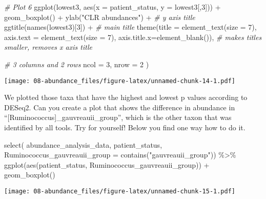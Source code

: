 \documentclass[
  oneside]{book}
\newenvironment{Shaded}{\begin{snugshade}}{\end{snugshade}}
\newcommand{\AttributeTok}[1]{\textcolor[rgb]{0.77,0.63,0.00}{#1}}
\newcommand{\CommentTok}[1]{\textcolor[rgb]{0.56,0.35,0.01}{\textit{#1}}}
\newcommand{\DecValTok}[1]{\textcolor[rgb]{0.00,0.00,0.81}{#1}}
\newcommand{\FunctionTok}[1]{\textcolor[rgb]{0.00,0.00,0.00}{#1}}
\newcommand{\NormalTok}[1]{#1}
\newcommand{\SpecialCharTok}[1]{\textcolor[rgb]{0.00,0.00,0.00}{#1}}
\newcommand{\StringTok}[1]{\textcolor[rgb]{0.31,0.60,0.02}{#1}}
\begin{document}
\begin{Shaded}
\begin{Highlighting}[]
  \CommentTok{\# Plot 6}
  \FunctionTok{ggplot}\NormalTok{(lowest3, }\FunctionTok{aes}\NormalTok{(}\AttributeTok{x =}\NormalTok{ patient\_status, }\AttributeTok{y =}\NormalTok{ lowest3[,}\DecValTok{3}\NormalTok{])) }\SpecialCharTok{+} 
    \FunctionTok{geom\_boxplot}\NormalTok{() }\SpecialCharTok{+} 
    \FunctionTok{ylab}\NormalTok{(}\StringTok{"CLR abundances"}\NormalTok{) }\SpecialCharTok{+} \CommentTok{\# y axis title}
    \FunctionTok{ggtitle}\NormalTok{(}\FunctionTok{names}\NormalTok{(lowest3)[}\DecValTok{3}\NormalTok{]) }\SpecialCharTok{+} \CommentTok{\# main title}
    \FunctionTok{theme}\NormalTok{(}\AttributeTok{title =} \FunctionTok{element\_text}\NormalTok{(}\AttributeTok{size =} \DecValTok{7}\NormalTok{),}
          \AttributeTok{axis.text =} \FunctionTok{element\_text}\NormalTok{(}\AttributeTok{size =} \DecValTok{7}\NormalTok{),}
          \AttributeTok{axis.title.x=}\FunctionTok{element\_blank}\NormalTok{()), }\CommentTok{\# makes titles smaller, removes x axis title}
  
  \CommentTok{\# 3 columns and 2 rows}
  \AttributeTok{ncol =} \DecValTok{3}\NormalTok{, }
  \AttributeTok{nrow =} \DecValTok{2}
\NormalTok{)}
\end{Highlighting}
\end{Shaded}

\texttt{[image: 08-abundance\_files/figure-latex/unnamed-chunk-14-1.pdf]}

We plotted those taxa that have the highest and lowest p values according to DESeq2. Can you create a plot that shows the difference in abundance in ``{[}Ruminococcus{]}\_gauvreauii\_group'', which is the other taxon that was identified by all tools. Try for yourself! Below you find one way how to do it.

\begin{Shaded}
\begin{Highlighting}[]
\FunctionTok{select}\NormalTok{(}
\NormalTok{  abundance\_analysis\_data, }
\NormalTok{  patient\_status, }
  \AttributeTok{Ruminococcus\_gauvreauii\_group =} \FunctionTok{contains}\NormalTok{(}\StringTok{"gauvreauii\_group"}\NormalTok{)) }\SpecialCharTok{\%\textgreater{}\%}
  \FunctionTok{ggplot}\NormalTok{(}\FunctionTok{aes}\NormalTok{(patient\_status, Ruminococcus\_gauvreauii\_group)) }\SpecialCharTok{+}
  \FunctionTok{geom\_boxplot}\NormalTok{()}
\end{Highlighting}
\end{Shaded}

\texttt{[image: 08-abundance\_files/figure-latex/unnamed-chunk-15-1.pdf]}
\end{document}
